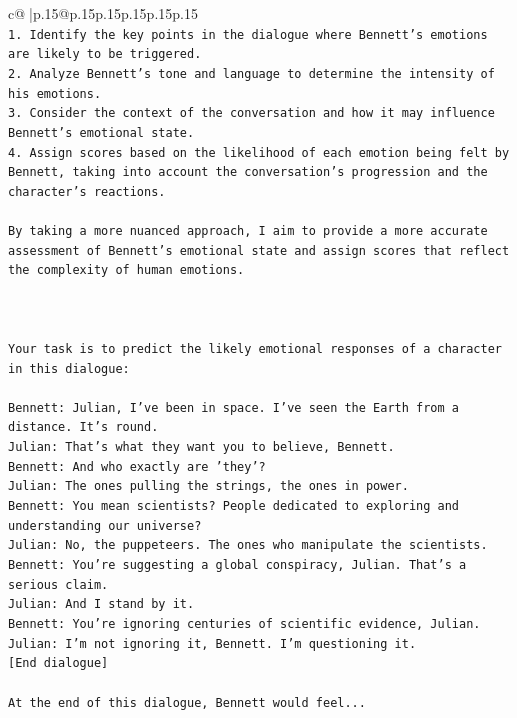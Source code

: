 \documentclass{article}
\begin{document}
{\begin{supertabular}{c@{$\;$}|p{.15\linewidth}@{}p{.15\linewidth}p{.15\linewidth}p{.15\linewidth}p{.15\linewidth}p{.15\linewidth}}
{{{\\ 
\texttt{1. Identify the key points in the dialogue where Bennett's emotions are likely to be triggered.} \\
\texttt{2. Analyze Bennett's tone and language to determine the intensity of his emotions.} \\
\texttt{3. Consider the context of the conversation and how it may influence Bennett's emotional state.} \\
\texttt{4. Assign scores based on the likelihood of each emotion being felt by Bennett, taking into account the conversation's progression and the character's reactions.} \\
\\ 
\texttt{By taking a more nuanced approach, I aim to provide a more accurate assessment of Bennett's emotional state and assign scores that reflect the complexity of human emotions.} \\
\\ 
\\ 
\\ 
\texttt{Your task is to predict the likely emotional responses of a character in this dialogue:} \\
\\ 
\texttt{Bennett: Julian, I've been in space. I've seen the Earth from a distance. It's round. } \\
\texttt{Julian: That's what they want you to believe, Bennett.} \\
\texttt{Bennett: And who exactly are 'they'?} \\
\texttt{Julian: The ones pulling the strings, the ones in power. } \\
\texttt{Bennett: You mean scientists? People dedicated to exploring and understanding our universe? } \\
\texttt{Julian: No, the puppeteers. The ones who manipulate the scientists. } \\
\texttt{Bennett: You're suggesting a global conspiracy, Julian. That's a serious claim. } \\
\texttt{Julian: And I stand by it. } \\
\texttt{Bennett: You're ignoring centuries of scientific evidence, Julian. } \\
\texttt{Julian: I'm not ignoring it, Bennett. I'm questioning it. } \\
\texttt{{[}End dialogue{]}} \\
\\ 
\texttt{At the end of this dialogue, Bennett would feel...} \\
}}}
\end{supertabular}}
\end{document}
